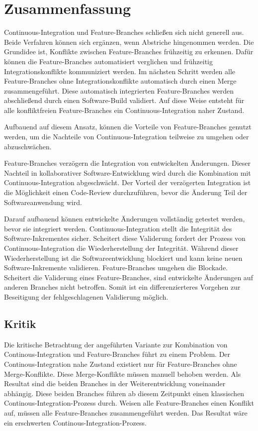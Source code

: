 \chapter{Zusammenfassung}

Continuous-Integration und Feature-Branches schließen sich nicht generell aus. Beide Verfahren können sich ergänzen, wenn Abstriche hingenommen werden. Die Grundidee ist, Konflikte zwischen Feature-Branches frühzeitig zu erkennen. Dafür können die Feature-Branches automatisiert verglichen und frühzeitig Integrationskonflikte kommuniziert werden. Im nächsten Schritt werden alle Feature-Branches ohne Integrationskonflikte automatisch durch einen Merge zusammengeführt. Diese automatisch integrierten Feature-Branches werden abschließend durch einen Software-Build validiert. Auf diese Weise entsteht für alle konfliktfreien Feature-Branches ein Continuous-Integration naher Zustand.

Aufbauend auf diesem Ansatz, können die Vorteile von Feature-Branches genutzt werden, um die Nachteile von Continuous-Integration teilweise zu umgehen oder abzuschwächen.

Feature-Branches verzögern die Integration von entwickelten Änderungen. Dieser Nachteil in kollaborativer Software-Entwicklung wird durch die Kombination mit Continuous-Integration abgeschwächt. Der Vorteil der verzögerten Integration ist die Möglichkeit einen Code-Review durchzuführen, bevor die Änderung Teil der Softwareanwendung wird. 

Darauf aufbauend können entwickelte Änderungen vollständig getestet werden, bevor sie integriert werden. Continuous-Integration stellt die Integrität des Software-Inkrementes sicher. Scheitert diese Validerung fordert der Prozess von Continuous-Integration die Wiederherstellung der Integrität. Während dieser Wiederherstellung ist die Softwareentwicklung blockiert und kann keine neuen Software-Inkremente validieren. Feature-Branches umgehen die Blockade. Scheitert die Validerung eines Feature-Branches, sind entwickelte Änderungen auf anderen Branches nicht betroffen. Somit ist ein differenzierteres Vorgehen zur Beseitigung der fehlgeschlagenen Validierung möglich.

\section{Kritik}

Die kritische Betrachtung der angeführten Variante zur Kombination von Continous\hyp{}Integration und Feature-Branches führt zu einem Problem. Der Continous-Integration nahe Zustand existiert nur für Feature-Branches ohne Merge-Konflikte. Diese Merge-Konflikte müssen manuell behoben werden. Als Resultat sind die beiden Branches in der Weiterentwicklung voneinander abhängig. Diese beiden Branches führen ab diesem Zeitpunkt einen \glqq klassischen\grqq{} Continous-Integration-Prozess durch. Weisen alle Feature-Branches einen Konflikt auf, müssen alle Feature-Branches zusammengeführt werden. Das Resultat wäre ein \glqq erschwerten\grqq{} Continous-Integration-Prozess.

